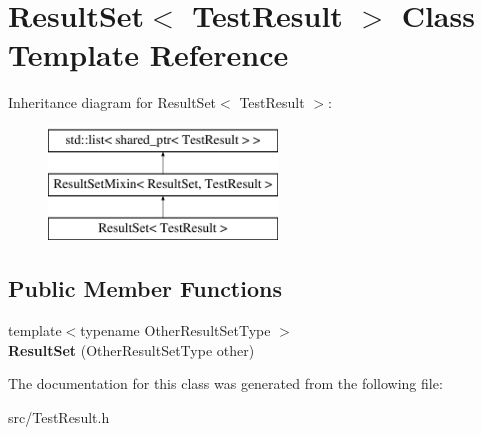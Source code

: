 \hypertarget{class_result_set_3_01_test_result_01_4}{\section{Result\-Set$<$ Test\-Result $>$ Class Template Reference}
\label{class_result_set_3_01_test_result_01_4}
}
Inheritance diagram for Result\-Set$<$ Test\-Result $>$\-:\begin{figure}[H]
\begin{center}
\leavevmode
\includegraphics[height=3.000000cm]{class_result_set_3_01_test_result_01_4}
\end{center}
\end{figure}
\subsection*{Public Member Functions}
\begin{DoxyCompactItemize}
\item 
\hypertarget{class_result_set_3_01_test_result_01_4_ab89a3e048b7b7bce7eece7e48a99c34e}{{\footnotesize template$<$typename Other\-Result\-Set\-Type $>$ }\\{\bfseries Result\-Set} (Other\-Result\-Set\-Type other)}\label{class_result_set_3_01_test_result_01_4_ab89a3e048b7b7bce7eece7e48a99c34e}

\end{DoxyCompactItemize}


The documentation for this class was generated from the following file\-:\begin{DoxyCompactItemize}
\item 
src/Test\-Result.\-h\end{DoxyCompactItemize}
